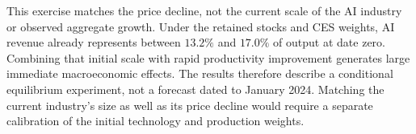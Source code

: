 \begin{samepage}
This exercise matches the price decline, not the current scale of the AI
industry or observed aggregate growth. Under the retained stocks and CES
weights, AI revenue already represents between $13.2\%$ and $17.0\%$ of
output at date zero. Combining that initial scale with rapid productivity
improvement generates large immediate macroeconomic effects. The results
therefore describe a conditional equilibrium experiment, not a forecast
dated to January 2024. Matching the current industry's size as well as its
price decline would require a separate calibration of the initial technology
and production weights.

\end{samepage}
